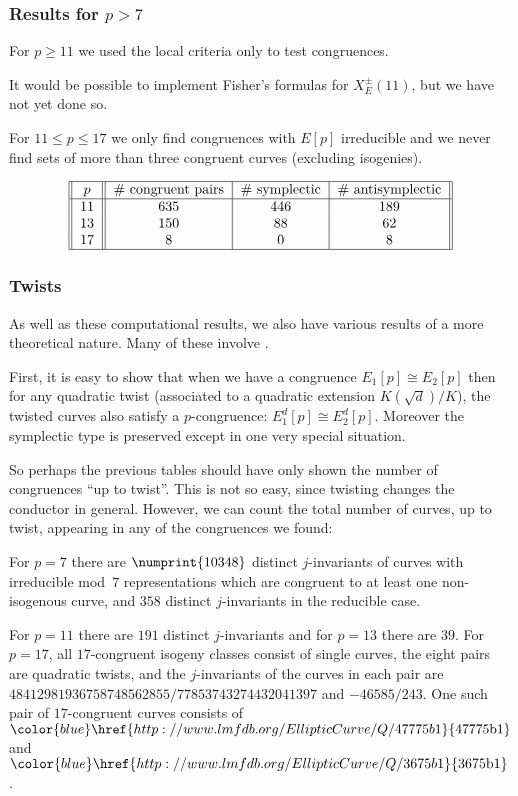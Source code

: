\documentclass[compress]{beamer}
\newcommand{\lmfdbec}[3]{\color{blue}\href{http://www.lmfdb.org/EllipticCurve/Q/#1#2#3}{{\text{\rm#1#2#3}}}}
\newcommand{\high}[1]{\emph{\color{blue}{#1}}}
\begin{document}
\begin{frame}\frametitle{Results for $p>7$}
For $p\ge11$ we used the local criteria only to test congruences.

It would be possible to implement Fisher's formulas for
$X_E^{\pm}(11)$, but we have not yet done so.

For $11\le p\le 17$ we only find congruences with $E[p]$ irreducible
and we never find sets of more than three congruent curves (excluding
isogenies).


  \[
  \begin{tabular}{||c||c|c|c||}
    \hline
    $p$ & \# congruent pairs & \# symplectic & \# antisymplectic\\
    \hline
    11 & 635 & 446 & 189 \\
    13 & 150 & 88 & 62 \\
    17 & 8 & 0 & 8 \\
    \hline
  \end{tabular}
  \]
\end{frame}

\begin{frame}\frametitle{Twists}
As well as these computational results, we also have various results
of a more theoretical nature.  Many of these involve \high{twists}.

First, it is easy to show that when we have a congruence $E_1[p]\cong
E_2[p]$ then for any quadratic twist (associated to a quadratic
extension $K(\sqrt{d})/K$), the twisted curves also satisfy a
$p$-congruence: $E_1^d[p]\cong E_2^d[p]$.  Moreover the symplectic
type is preserved except in one very special situation.

So perhaps the previous tables should have only shown the number of
congruences ``up to twist''.  This is not so easy, since twisting
changes the conductor in general.  However, we can count the total
number of curves, up to twist, appearing in any of the congruences we
found:

For $p=7$ there are $\numprint{10348}$ distinct $j$-invariants of
curves with irreducible mod~$7$ representations which are congruent to
at least one non-isogenous curve, and $358$ distinct $j$-invariants in
the reducible case.

For $p=11$ there are $191$ distinct $j$-invariants and for $p=13$
there are $39$.  For $p=17$, all $17$-congruent isogeny classes
consist of single curves, the eight pairs are quadratic twists, and
the $j$-invariants of the curves in each pair are
$48412981936758748562855/77853743274432041397$ and $-46585/243$.  One
such pair of $17$-congruent curves consists of $\lmfdbec{47775}{b}{1}$
and~$\lmfdbec{3675}{b}{1}$.

\end{frame}
\end{document}
